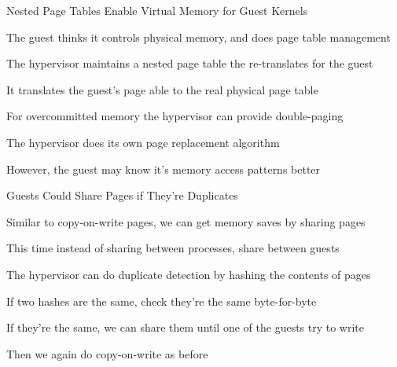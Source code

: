   \begin{frame}{Nested Page Tables Enable Virtual Memory for Guest Kernels}

    The guest thinks it controls physical memory, and does page table management

    \vspace{2em}

    The hypervisor maintains a nested page table the re-translates for the guest

    \hspace{2em} It translates the guest's page able to the real physical page
                 table

    \vspace{2em}

    For overcommitted memory the hypervisor can provide double-paging

    \hspace{2em} The hypervisor does its own page replacement algorithm

    \hspace{4em} However, the guest may know it's memory access patterns better
  \end{frame}

  \begin{frame}{Guests Could Share Pages if They're Duplicates}

    Similar to copy-on-write pages, we can get memory saves by sharing pages

    \hspace{2em} This time instead of sharing between processes, share between
                 guests

    \vspace{2em}

    The hypervisor can do duplicate detection by hashing the contents of pages

    \hspace{2em} If two hashes are the same, check they're the same
                 byte-for-byte

    \vspace{2em}

    If they're the same, we can share them until one of the guests try to write

    \hspace{2em} Then we again do copy-on-write as before
  \end{frame}


